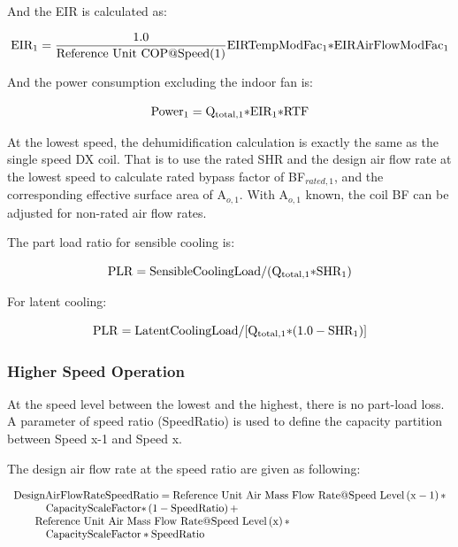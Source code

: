 And the EIR is calculated as:

\begin{equation}
\rm{EI} \rm{R}_1 = \frac{1.0}{\rm{Reference~Unit~COP} @ \rm{Speed}(1)}{\rm{EIRTempModFa}}{\rm{c}_1}{\rm{*EIRAirFlowModFa}}{\rm{c}_1}
\end{equation}

And the power consumption excluding the indoor fan is:

\begin{equation}
{\rm{Powe}}{{\rm{r}}_1} = {{\rm{Q}}_{{\rm{total}},1}}{\rm{*EI}}{{\rm{R}}_1}{\rm{*RTF}}
\end{equation}

At the lowest speed, the dehumidification calculation is exactly the same as the single speed DX coil. That is to use the rated SHR and the design air flow rate at the lowest speed to calculate rated bypass factor of BF\(_{rated,1}\), and the corresponding effective surface area of A\(_{o,1}\). With A\(_{o,1}\) known, the coil BF can be adjusted for non-rated air flow rates.

The part load ratio for sensible cooling is:

\begin{equation}
{\rm{PLR}} = {\rm{SensibleCoolingLoad}}/({{\rm{Q}}_{{\rm{total}},1}}{\rm{*SH}}{{\rm{R}}_1})
\end{equation}

For latent cooling:

\begin{equation}
{\rm{PLR}} = {\rm{LatentCoolingLoad}}/[{{\rm{Q}}_{{\rm{total}},1}}{\rm{*}}(1.0 - {\rm{SH}}{{\rm{R}}_1})]
\end{equation}

\subsubsection{Higher Speed Operation}\label{higher-speed-operation-1-000}

At the speed level between the lowest and the highest, there is no part-load loss. A parameter of speed ratio (SpeedRatio) is used to define the capacity partition between Speed x-1 and Speed x.

The design air flow rate at the speed ratio are given as following:

\begin{equation}
  \begin{array}{l}
    \rm{DesignAirFlowRateSpeedRatio} = \rm{Reference~Unit~Air~Mass~Flow~Rate} @ \rm{Speed~Level} \left( \rm{x} - 1 \right) \rm{*} \\
    \quad \quad \quad \rm{CapacityScaleFactor*} \left( 1 - \rm{SpeedRatio} \right) + \\
    \quad \quad \rm{Reference~Unit~Air~Mass~Flow~Rate} @ \rm{Speed~Level} \left( \rm{x} \right) \rm{*} \\
    \quad \quad \quad \rm{CapacityScaleFactor*SpeedRatio}
  \end{array}
\end{equation}

